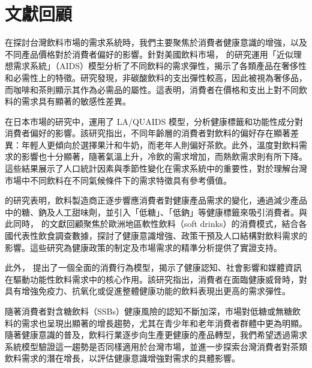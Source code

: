 \section{文獻回顧}

在探討台灣飲料市場的需求系統時，我們主要聚焦於消費者健康意識的增強，以及不同產品價格對於消費者偏好的影響。針對美國飲料市場，\citet{RN2} 的研究運用「近似理想需求系統」（AIDS）模型分析了不同飲料的需求彈性，揭示了各類產品在奢侈性和必需性上的特徵。研究發現，非碳酸飲料的支出彈性較高，因此被視為奢侈品，而咖啡和茶則顯示其作為必需品的屬性。這表明，消費者在價格和支出上對不同飲料的需求具有顯著的敏感性差異。

\citet{RN1} 在日本市場的研究中，運用了 LA/QUAIDS 模型，分析健康標籤和功能性成分對消費者偏好的影響。該研究指出，不同年齡層的消費者對飲料的偏好存在顯著差異：年輕人更傾向於選擇果汁和牛奶，而老年人則偏好茶飲。此外，溫度對飲料需求的影響也十分顯著，隨著氣溫上升，冷飲的需求增加，而熱飲需求則有所下降。這些結果展示了人口統計因素與季節性變化在需求系統中的重要性，對於理解台灣市場中不同飲料在不同氣候條件下的需求特徵具有參考價值。

\citet{RN9} 的研究表明，飲料製造商正逐步響應消費者對健康產品需求的變化，通過減少產品中的糖、鈉及人工甜味劑，並引入「低糖」、「低鈉」等健康標籤來吸引消費者。與此同時，\citet{RN3} 的文獻回顧聚焦於歐洲地區軟性飲料（soft drinks）的消費模式，結合各國代表性飲食調查數據，探討了健康意識增強、政策干預及人口結構對飲料需求的影響。這些研究為健康政策的制定及市場需求的精準分析提供了實證支持。

此外，\citet{Rn15} 提出了一個全面的消費行為模型，揭示了健康認知、社會影響和媒體資訊在驅動功能性飲料需求中的核心作用。該研究指出，消費者在面臨健康威脅時，對具有增強免疫力、抗氧化或促進整體健康功能的飲料表現出更高的需求彈性。

隨著消費者對含糖飲料（SSBs）健康風險的認知不斷加深，市場對低糖或無糖飲料的需求也呈現出顯著的增長趨勢，尤其在青少年和老年消費者群體中更為明顯\citep{RN3}。隨著健康意識的普及，飲料行業逐步向生產更健康的產品轉型，我們希望透過需求系統模型驗證這一趨勢是否同樣適用於台灣市場，並進一步探索台灣消費者對茶類飲料需求的潛在增長，以評估健康意識增強對需求的具體影響。


